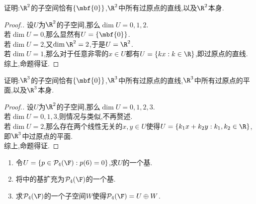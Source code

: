 \documentclass{ctexart}
\begin{document}
\pagestyle{empty}
\begin{problem}[1.]
    证明:$\R^2$的子空间恰有$\left\{\mbf{0}\right\}$,$\R^2$中所有过原点的直线,以及$\R^2$本身.
\end{problem}
\begin{proof}[Proof.]
    设$U$为$\R^2$的子空间,那么$\dim U=0,1,2$.\\
    若$\dim U=0$,那么显然有$U=\left\{\mbf{0}\right\}$.\\
    若$\dim U=2$,又$\dim \R^2=2$,于是$U=\R^2$.\\
    若$\dim U=1$,那么对于任意非零的$x\in U$都有$U=\left\{kx:k\in\R\right\}$,即过原点的直线.\\
    综上,命题得证.
\end{proof}
\begin{problem}[2.]
    证明:$\R^3$的子空间恰有$\left\{\mbf{0}\right\}$,$\R^3$中所有过原点的直线,$\R^3$中所有过原点的平面,以及$\R^3$本身.
\end{problem}
\begin{proof}[Proof.]
    设$U$为$\R^2$的子空间,那么$\dim U=0,1,2,3$.\\
    若$\dim U=0,1,3$,则情况与类似,不再赘述.\\
    若$\dim U=2$,那么存在两个线性无关的$x,y\in U$使得$U=\left\{k_1x+k_2y:k_1,k_2\in\R\right\}$,即$\R^3$中过原点的平面.\\
    综上,命题得证.
\end{proof}
\begin{problem}[3.]
    \begin{enumerate}[label=\tbf{(\alph*)}]
        \item 令$U=\left\{p\in\mathcal{P}_4(\F):p(6)=0\right\}$,求$U$的一个基.
        \item 将中的基扩充为$\mathcal{P}_4(\F)$的一个基.
        \item 求$\mathcal{P}_4(\F)$的一个子空间$W$使得$\mathcal{P}_4(\F)=U\oplus W$.
    \end{enumerate}
\end{problem}
\end{document}
